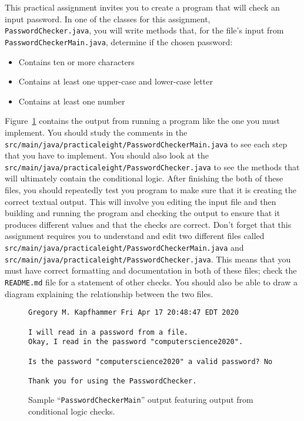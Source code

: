 \documentclass[11pt]{article}
\newcommand{\mainprogramsource}{\lstinline{src/main/java/practicaleight/PasswordCheckerMain.java}}
\newcommand{\secondprogramsource}{\lstinline{src/main/java/practicaleight/PasswordChecker.java}}
\begin{document}
This practical assignment invites you to create a program that will check an
input password. In one of the classes for this assignment, {\tt
PasswordChecker.java}, you will write methods that, for the file's input from
{\tt PasswordCheckerMain.java}, determine if the chosen password:

\begin{itemize}

\item Contains ten or more characters

\item Contains at least one upper-case and lower-case letter

\item Contains at least one number

\end{itemize}

Figure~\ref{mad} contains the output from running a program like the one you
must implement. You should study the comments in the \mainprogramsource{} to see
each step that you have to implement. You should also look at the
\secondprogramsource{} to see the methods that will ultimately contain the
conditional logic. After finishing the both of these files, you should
repeatedly test you program to make sure that it is creating the correct textual
output. This will involve you editing the input file and then building and
running the program and checking the output to ensure that it produces different
values and that the checks are correct. Don't forget that this assignment
requires you to understand and edit two different files called
\mainprogramsource{} and \secondprogramsource{}. This means that you must have
correct formatting and documentation in both of these files; check the {\tt
README.md} file for a statement of other checks. You should also be able to draw
a diagram explaining the relationship between the two files.

\begin{figure}[tb]
\begin{Verbatim}[commandchars=\\\{\}]
Gregory M. Kapfhammer Fri Apr 17 20:48:47 EDT 2020

I will read in a password from a file.
Okay, I read in the password "computerscience2020".

Is the password "computerscience2020" a valid password? No

Thank you for using the PasswordChecker.
\end{Verbatim}
\vspace*{-.1in}
\caption{Sample ``{\tt PasswordCheckerMain}'' output featuring output from conditional logic checks.}
\label{mad}
\end{figure}
\end{document}
